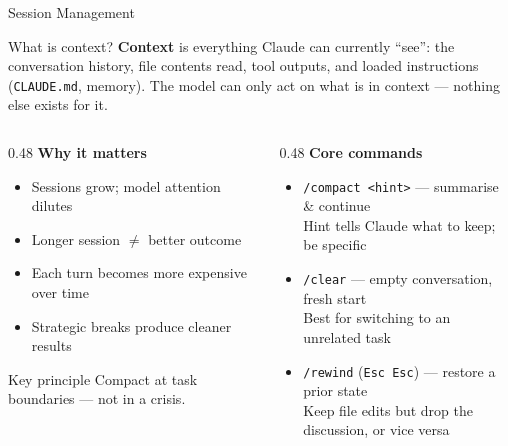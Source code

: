 \documentclass[aspectratio=169, 10pt]{beamer}
\begin{document}
\begin{frame}{Session Management}
  \begin{block}{What is context?}
    \small\textbf{Context} is everything Claude can currently ``see'': the conversation history, file contents read, tool outputs, and loaded instructions (\texttt{CLAUDE.md}, memory). The model can only act on what is in context --- nothing else exists for it.
  \end{block}
  \vspace{0.4em}
  \begin{columns}[T]
    \begin{column}{0.48\textwidth}
      \textbf{\color{biokteal}Why it matters}
      \begin{itemize}[label=\textbullet]\setlength\itemsep{4pt}
        \item Sessions grow; model attention dilutes
        \item Longer session $\neq$ better outcome
        \item Each turn becomes more expensive over time
        \item Strategic breaks produce cleaner results
      \end{itemize}
      \vspace{0.5em}
      \begin{block}{Key principle}
        \small Compact at task boundaries --- not in a crisis.
      \end{block}
    \end{column}
    \begin{column}{0.48\textwidth}
      \textbf{\color{biokteal}Core commands}
      \begin{itemize}[label=\textbullet]\setlength\itemsep{5pt}
        \item \texttt{/compact <hint>} --- summarise \& continue\\
              {\small Hint tells Claude what to keep; be specific}
        \item \texttt{/clear} --- empty conversation, fresh start\\
              {\small Best for switching to an unrelated task}
        \item \texttt{/rewind} (\texttt{Esc Esc}) --- restore a prior state\\
              {\small Keep file edits but drop the discussion, or vice versa}
      \end{itemize}
    \end{column}
  \end{columns}

\end{frame}
\end{document}
